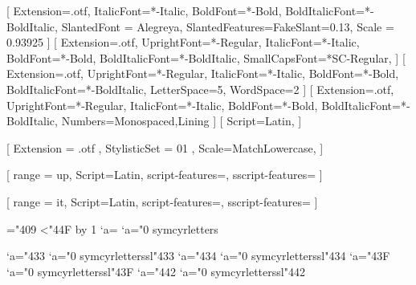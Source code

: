 % 
%


\setmainfont{Alegreya}[
  Extension=.otf,
  ItalicFont=*-Italic,
  BoldFont=*-Bold,
  BoldItalicFont=*-BoldItalic,
  SlantedFont = Alegreya,
  SlantedFeatures={FakeSlant=0.13},
  Scale = 0.93925
]
\setsansfont{AlegreyaSans}[
  Extension=.otf,
  UprightFont=*-Regular,
  ItalicFont=*-Italic,
  BoldFont=*-Bold,
  BoldItalicFont=*-BoldItalic,
  SmallCapsFont=*SC-Regular,
]
[
  Extension=.otf,
  UprightFont=*-Regular,
  ItalicFont=*-Italic,
  BoldFont=*-Bold,
  BoldItalicFont=*-BoldItalic,
  LetterSpace=5,
  WordSpace=2
]
[
  Extension=.otf,
  UprightFont=*-Regular,
  ItalicFont=*-Italic,
  BoldFont=*-Bold,
  BoldItalicFont=*-BoldItalic,
  Numbers={Monospaced,Lining}
]
[
  Script=Latin,
]

% 
%

\usepackage{unicode-math}

[%
  Extension = .otf ,
  StylisticSet = 01 ,
  Scale=MatchLowercase,
]

[%
  range = {up},
  Script=Latin,
  script-features={},
  sscript-features={}
]

[%
  range = {it},
  Script=Latin,
  script-features={},
  sscript-features={}
]

\newcommand{\makecyrmathletter}[1]{%
  \begingroup\lccode`a=#1\lowercase{\endgroup
  \Umathcode`a}="0 \csname symcyrletters\endcsname\space #1
}
="409
\loop\ifnum{}<"44F
  \advance{} by 1
  \makecyrmathletter{\count255}
\repeat


\newcommand{\makecyrmathlettersl}[1]{%
  \begingroup\lccode`a=#1\lowercase{\endgroup
  \Umathcode`a}="0 \csname symcyrletterssl\endcsname\space #1
}
\makecyrmathlettersl{"433} %
\makecyrmathlettersl{"434} %
\makecyrmathlettersl{"43F} %
\makecyrmathlettersl{"442} %
